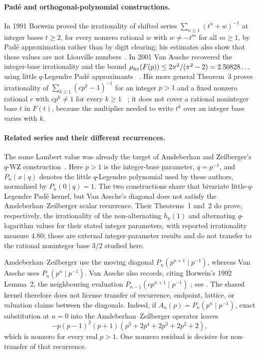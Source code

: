 \paragraph{Pad\'e and orthogonal-polynomial constructions.}
In 1991
Borwein proved the irrationality of shifted series
$\sum_{n\ge1}(t^{n}+w)^{-1}$ at integer bases $t\ge2$, for every nonzero
rational $w$ with $w\ne-t^m$ for all $m\ge1$, by Pad\'e approximation rather
than by digit clearing; his estimates also show that these values are not
Liouville numbers~\cite[Thm.~4, pp.~257--258]{borwein1991}.  In 2001 Van
Assche recovered the integer-base irrationality and the bound
$\mu_{\rm irr}(F(p))\le 2\pi^2/(\pi^2-2)=2.50828\ldots$ using little $q$-Legendre
Pad\'e approximants
~\cite[Thm.~1, p.~10; proof pp.~10--11]{vanassche2001}.  His more general
Theorem~3 proves irrationality of
$\sum_{k\ge1}(cp^k-1)^{-1}$ for an integer $p>1$ and a fixed nonzero
rational $c$ with $cp^k\ne1$ for every $k\ge1$
~\cite[Thm.~3, p.~14]{vanassche2001}; it does not cover a
rational noninteger base $t$ in $F(t)$, because the multiplier needed to
write $t^k$ over an integer base varies with $k$.

\paragraph{Related series and their different recurrences.}
The same Lambert value was already the target of Amdeberhan and
Zeilberger's $q$-WZ construction~\cite{az1998}.  Here $p>1$ is the integer-base parameter, $q=p^{-1}$, and
$P_n(x\mid q)$ denotes the little $q$-Legendre polynomial used by these
authors, normalised by $P_n(0\mid q)=1$.  The two constructions
share that bivariate little-$q$-Legendre Pad\'e kernel, but Van Assche's
diagonal does not satisfy the Amdeberhan--Zeilberger scalar recurrence.
Their Theorems~1 and~2 do prove, respectively, the irrationality of the
non-alternating $h_p(1)$ and alternating $q$-logarithm values for their stated
integer parameters, with reported irrationality measure $4.80$; those are
external integer-parameter results and do not transfer to the rational
noninteger base $3/2$ studied here.

Amdeberhan--Zeilberger use the moving diagonal
$P_n(p^{n+1}\mid p^{-1})$, whereas Van Assche uses
$P_n(p^n\mid p^{-1})$.  Van Assche also records, citing
Borwein's 1992 Lemma~2, the neighbouring evaluation
$P_{n-1}(c p^{n+1}\mid p^{-1})$
\cite[(23) and the following paragraph, p.~6]{vanassche2001};
see \cite[Lemma~2, p.~143]{borwein1992}.
The shared kernel therefore does not license transfer of recurrence,
endpoint, lattice, or valuation claims between the diagonals.  Indeed, if
$A_n(p)=P_n(p^n\mid p^{-1})$, exact substitution at $n=0$ into the
Amdeberhan--Zeilberger operator \cite[Sec.~1.5, p.~2]{az1998} leaves
\[
 -p(p-1)^2(p+1)(p^5+2p^4+2p^3+2p^2+2),
\]
which is nonzero for every real $p>1$.  One nonzero residual is decisive for
non-transfer of that recurrence.

